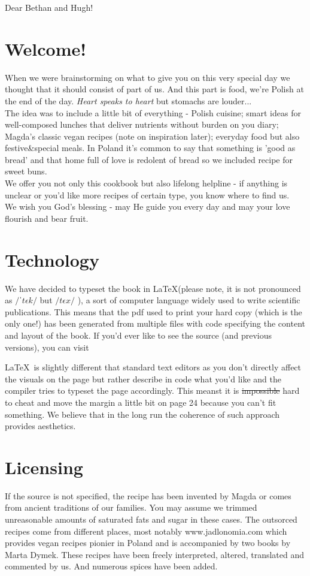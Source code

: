 
Dear Bethan and Hugh!

\section*{Welcome!}
When we were brainstorming on what to give you on this very special day we thought that it should consist of part of us. And this part is food, we're Polish at the end of the day. \textit{Heart speaks to heart} but stomachs are louder...
\\
The idea was to include a little bit of everything - Polish cuisine; smart ideas for well-composed lunches that deliver nutrients without burden on you diary; Magda's classic vegan recipes (note on inspiration later); everyday food but also festive\&special meals. In Poland it's common to say that something is 'good as bread' and that home full of love is redolent of bread so we included recipe for sweet buns.\\
We offer you not only this cookbook but also lifelong helpline - if anything is unclear or you'd like more recipes of certain type, you know where to find us.\\
We wish you God's blessing - may He guide you every day and may your love flourish and bear fruit.


\section*{Technology}
We have decided to typeset the book in \LaTeX (please note, it is not pronounced as $/ˈt\epsilon k/$  but  $/t\epsilon x/$ ),
a sort of computer language widely used to write scientific publications.
This means that the pdf used to print your hard copy (which is the only one!)
has been generated from multiple files with code specifying the content and layout
of the book.
If you'd ever like to see the source (and previous versions),
you can visit 

\LaTeX~is slightly different that standard text editors as you don't directly affect the visuals
on the page but rather describe in code what you'd like and the compiler tries to
typeset the page accordingly.
This meanst it is \sout{impossible} hard to cheat and
move the margin a little bit on page 24 because you can't fit something.
We believe that in the long run the coherence of such approach provides aesthetics.

\section*{Licensing}
If the source is not specified, the recipe has been invented by Magda or comes from
ancient traditions of our families.
You may assume we trimmed unreasonable amounts of saturated fats and sugar in these cases.
The outsorced recipes come from different places, most notably www.jadlonomia.com which
provides vegan recipes pionier in Poland and is accompanied by two books by Marta Dymek.
These recipes have been freely interpreted, altered, translated and commented by us. And numerous spices have been added.

